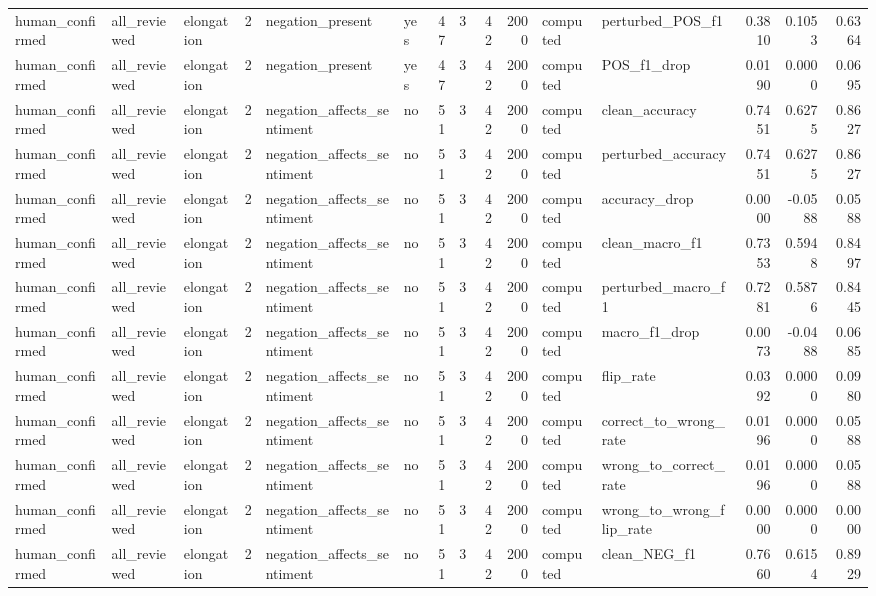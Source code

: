\begin{tabular}{lllrllrrrrllrrr}
human_confirmed & all_reviewed & elongation & 2 & negation_present & yes & 47 & 3 & 42 & 2000 & computed & perturbed_POS_f1 & 0.3810 & 0.1053 & 0.6364 \\
human_confirmed & all_reviewed & elongation & 2 & negation_present & yes & 47 & 3 & 42 & 2000 & computed & POS_f1_drop & 0.0190 & 0.0000 & 0.0695 \\
human_confirmed & all_reviewed & elongation & 2 & negation_affects_sentiment & no & 51 & 3 & 42 & 2000 & computed & clean_accuracy & 0.7451 & 0.6275 & 0.8627 \\
human_confirmed & all_reviewed & elongation & 2 & negation_affects_sentiment & no & 51 & 3 & 42 & 2000 & computed & perturbed_accuracy & 0.7451 & 0.6275 & 0.8627 \\
human_confirmed & all_reviewed & elongation & 2 & negation_affects_sentiment & no & 51 & 3 & 42 & 2000 & computed & accuracy_drop & 0.0000 & -0.0588 & 0.0588 \\
human_confirmed & all_reviewed & elongation & 2 & negation_affects_sentiment & no & 51 & 3 & 42 & 2000 & computed & clean_macro_f1 & 0.7353 & 0.5948 & 0.8497 \\
human_confirmed & all_reviewed & elongation & 2 & negation_affects_sentiment & no & 51 & 3 & 42 & 2000 & computed & perturbed_macro_f1 & 0.7281 & 0.5876 & 0.8445 \\
human_confirmed & all_reviewed & elongation & 2 & negation_affects_sentiment & no & 51 & 3 & 42 & 2000 & computed & macro_f1_drop & 0.0073 & -0.0488 & 0.0685 \\
human_confirmed & all_reviewed & elongation & 2 & negation_affects_sentiment & no & 51 & 3 & 42 & 2000 & computed & flip_rate & 0.0392 & 0.0000 & 0.0980 \\
human_confirmed & all_reviewed & elongation & 2 & negation_affects_sentiment & no & 51 & 3 & 42 & 2000 & computed & correct_to_wrong_rate & 0.0196 & 0.0000 & 0.0588 \\
human_confirmed & all_reviewed & elongation & 2 & negation_affects_sentiment & no & 51 & 3 & 42 & 2000 & computed & wrong_to_correct_rate & 0.0196 & 0.0000 & 0.0588 \\
human_confirmed & all_reviewed & elongation & 2 & negation_affects_sentiment & no & 51 & 3 & 42 & 2000 & computed & wrong_to_wrong_flip_rate & 0.0000 & 0.0000 & 0.0000 \\
human_confirmed & all_reviewed & elongation & 2 & negation_affects_sentiment & no & 51 & 3 & 42 & 2000 & computed & clean_NEG_f1 & 0.7660 & 0.6154 & 0.8929 \\

\end{tabular}
